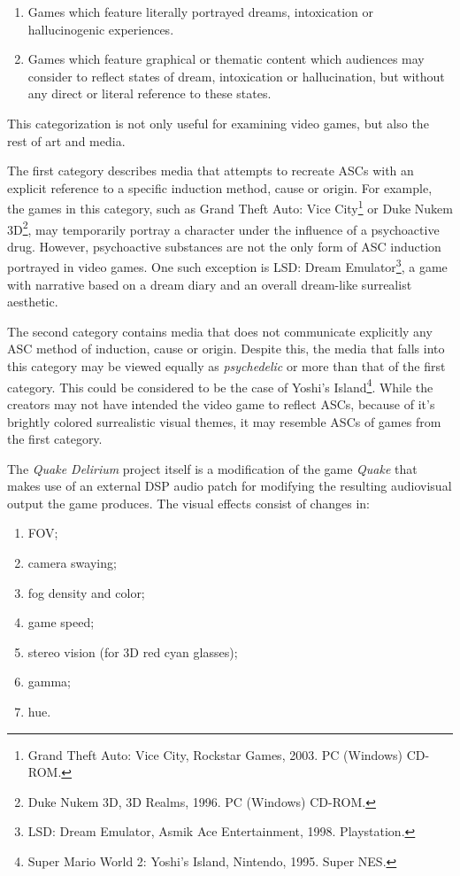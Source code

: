 \begin{enumerate}
    \item Games which feature literally portrayed dreams, intoxication or hallucinogenic experiences.
    \item Games which feature graphical or thematic content which audiences may consider to reflect states of dream, intoxication or hallucination, but without any direct or literal reference to these states.
\end{enumerate}

This categorization is not only useful for examining video games, but also the rest of art and media.

The first category describes media that attempts to recreate \acp{ASC} with an explicit reference to a specific induction method, cause or origin. For example, the games in this category, such as {Grand Theft Auto: Vice City}\footnote{Grand Theft Auto: Vice City, Rockstar Games, 2003. PC (Windows) CD-ROM.} or {Duke Nukem 3D}\footnote{Duke Nukem 3D, 3D Realms, 1996. PC (Windows)
CD-ROM.}, may temporarily portray a character under the influence of a psychoactive drug. However, psychoactive substances are not the only form of \ac{ASC} induction portrayed in video games. One such exception is {LSD: Dream Emulator}\footnote{LSD: Dream Emulator, Asmik Ace Entertainment, 1998. Playstation.}, a game with narrative based on a dream diary and an overall dream-like surrealist aesthetic.

The second category contains media that does not communicate explicitly any \ac{ASC} method of induction, cause or origin. Despite this, the media that falls into this category may be viewed equally as \textit{psychedelic} or more than that of the first category. This could be considered to be the case of {Yoshi's Island}\footnote{Super Mario World 2: Yoshi’s Island, Nintendo, 1995. Super NES.}. While the creators may not have intended the video game to reflect \acp{ASC}, because of it's brightly colored surrealistic visual themes, it may resemble \acp{ASC} of games from the first category.

The \textit{Quake Delirium} project itself is a modification of the game \textit{Quake} that makes use of an external \ac{DSP} audio patch for modifying the resulting audiovisual output the game produces. The visual effects consist of changes in:

\begin{enumerate}
    \item \ac{FOV};
    \item camera swaying;
    \item fog density and color;
    \item game speed;
    \item stereo vision (for 3D red cyan glasses);
    \item gamma;
    \item hue.
\end{enumerate}

